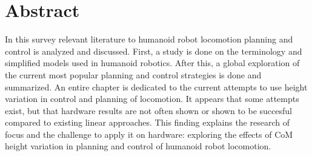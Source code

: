 %
\chapter*{Abstract}%

In this survey relevant literature to humanoid robot locomotion planning and control is analyzed and discussed. First, a  study is done on the terminology and simplified models used in humanoid robotics. After this, a global exploration of the current most popular planning and control strategies is done and summarized. An entire chapter is dedicated to the current attempts to use height variation in control and planning of locomotion. It appears that some attempts exist, but that hardware results are not often shown or shown to be succesful compared to existing linear approaches. This finding explains the research of focus and the challenge to apply it on hardware: exploring the effects of \ac{CoM} height variation in planning and control of humanoid robot locomotion.
